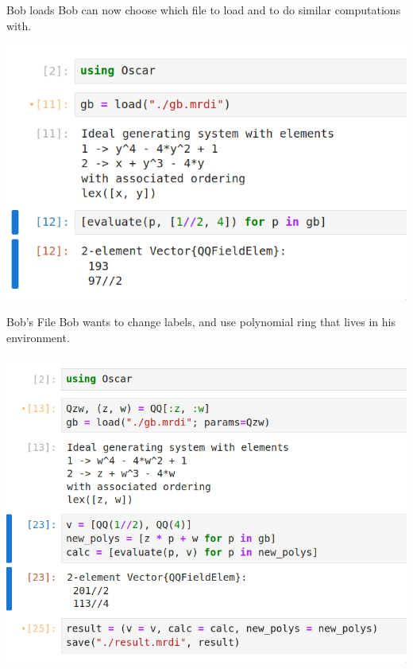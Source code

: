 \documentclass[9pt]{beamer}
\theoremstyle{definition}
\begin{document}
\begin{frame}[fragile]{Bob loads}
  Bob can now choose which file to load and to do similar computations with.
  \begin{center}
    \includegraphics[height=0.5\textheight]{images/load}
  \end{center}
\end{frame}


\begin{frame}[fragile]{Bob's File}
  Bob wants to change labels, and use polynomial ring that lives in his environment.
  \begin{center}
    \includegraphics[height=0.7\textheight]{images/bob_save}
  \end{center}
\end{frame}
\end{document}
